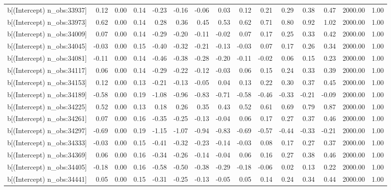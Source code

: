 \begin{table}[ht]
\begin{tabular}{rrrrrrrrrrrrrrr}
  b[(Intercept) n\_obs:33937] & 0.12 & 0.00 & 0.14 & -0.23 & -0.16 & -0.06 & 0.03 & 0.12 & 0.21 & 0.29 & 0.38 & 0.47 & 2000.00 & 1.00 \\ 
  b[(Intercept) n\_obs:33973] & 0.62 & 0.00 & 0.14 & 0.28 & 0.36 & 0.45 & 0.53 & 0.62 & 0.71 & 0.80 & 0.92 & 1.02 & 2000.00 & 1.00 \\ 
  b[(Intercept) n\_obs:34009] & 0.07 & 0.00 & 0.14 & -0.29 & -0.20 & -0.11 & -0.02 & 0.07 & 0.17 & 0.25 & 0.33 & 0.42 & 2000.00 & 1.00 \\ 
  b[(Intercept) n\_obs:34045] & -0.03 & 0.00 & 0.15 & -0.40 & -0.32 & -0.21 & -0.13 & -0.03 & 0.07 & 0.17 & 0.26 & 0.34 & 2000.00 & 1.00 \\ 
  b[(Intercept) n\_obs:34081] & -0.11 & 0.00 & 0.14 & -0.46 & -0.38 & -0.28 & -0.20 & -0.11 & -0.02 & 0.06 & 0.15 & 0.23 & 2000.00 & 1.00 \\ 
  b[(Intercept) n\_obs:34117] & 0.06 & 0.00 & 0.14 & -0.29 & -0.22 & -0.12 & -0.03 & 0.06 & 0.15 & 0.24 & 0.33 & 0.39 & 2000.00 & 1.00 \\ 
  b[(Intercept) n\_obs:34153] & 0.12 & 0.00 & 0.13 & -0.21 & -0.13 & -0.05 & 0.04 & 0.13 & 0.22 & 0.30 & 0.37 & 0.45 & 2000.00 & 1.00 \\ 
  b[(Intercept) n\_obs:34189] & -0.58 & 0.00 & 0.19 & -1.08 & -0.96 & -0.83 & -0.71 & -0.58 & -0.46 & -0.33 & -0.21 & -0.09 & 2000.00 & 1.00 \\ 
  b[(Intercept) n\_obs:34225] & 0.52 & 0.00 & 0.13 & 0.18 & 0.26 & 0.35 & 0.43 & 0.52 & 0.61 & 0.69 & 0.79 & 0.87 & 2000.00 & 1.00 \\ 
  b[(Intercept) n\_obs:34261] & 0.07 & 0.00 & 0.16 & -0.35 & -0.25 & -0.13 & -0.04 & 0.06 & 0.17 & 0.27 & 0.37 & 0.46 & 2000.00 & 1.00 \\ 
  b[(Intercept) n\_obs:34297] & -0.69 & 0.00 & 0.19 & -1.15 & -1.07 & -0.94 & -0.83 & -0.69 & -0.57 & -0.44 & -0.33 & -0.21 & 2000.00 & 1.00 \\ 
  b[(Intercept) n\_obs:34333] & -0.03 & 0.00 & 0.15 & -0.41 & -0.32 & -0.23 & -0.14 & -0.03 & 0.08 & 0.17 & 0.27 & 0.37 & 2000.00 & 1.00 \\ 
  b[(Intercept) n\_obs:34369] & 0.06 & 0.00 & 0.16 & -0.34 & -0.26 & -0.14 & -0.04 & 0.06 & 0.16 & 0.27 & 0.38 & 0.46 & 2000.00 & 1.00 \\ 
  b[(Intercept) n\_obs:34405] & -0.18 & 0.00 & 0.16 & -0.58 & -0.50 & -0.38 & -0.29 & -0.18 & -0.06 & 0.02 & 0.13 & 0.22 & 2000.00 & 1.00 \\ 
  b[(Intercept) n\_obs:34441] & 0.05 & 0.00 & 0.15 & -0.31 & -0.25 & -0.13 & -0.05 & 0.05 & 0.14 & 0.24 & 0.34 & 0.44 & 2000.00 & 1.00 \\ 

\end{tabular}
\end{table}
